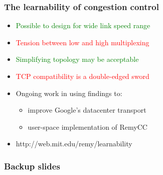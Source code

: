 \documentclass[svgnames]{beamer}
\begin{document}
\begin{Large}


\begin{frame}
\frametitle{The learnability of congestion control}
\noindent
\begin{itemize}
\item<1-> \textcolor{green}{Possible to design for wide link speed range}
\item<2-> \textcolor{red}{Tension between low and high multiplexing}
\item<3-> \textcolor{green}{Simplifying topology may be acceptable}
\item<4-> \textcolor{red}{TCP compatibility is a double-edged sword}
\item<6-> Ongoing work in using findings to:
\begin{itemize}
\item<7-> improve Google's datacenter transport
\item<8-> user-space implementation of RemyCC
\end{itemize}
\item<9-> http://web.mit.edu/remy/learnability
\end{itemize}
\end{frame}

\end{Large}

\begin{frame}
\frametitle{Backup slides}
\end{frame}







\end{document}
